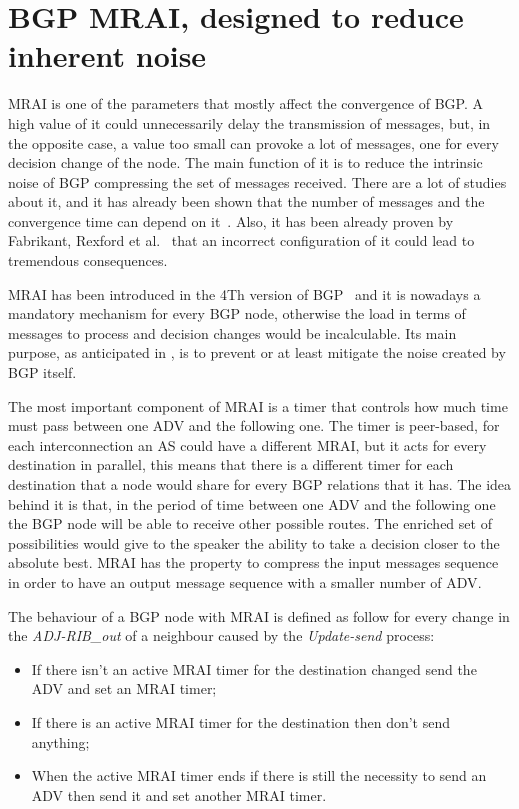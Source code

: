 
\section{BGP MRAI, designed to reduce inherent noise}
\label{sec:bgp_mrai}

\ac{MRAI} is one of the parameters that mostly affect the convergence of \ac{BGP}.
A high value of it could unnecessarily delay the transmission of messages, but,
in the opposite case, a value too small can provoke a lot of messages, one for
every decision change of the node.
The main function of it is to reduce the intrinsic noise of \ac{BGP} compressing
the set of messages received.
There are a lot of studies about it, and it has already been shown that
the number of messages and the convergence time can depend on it~\cite{griffin2001experimental}.
Also, it has been already proven by Fabrikant, Rexford et al.~\cite{fabrikant2011there}
that an incorrect configuration of it could lead to tremendous consequences.

\ac{MRAI} has been introduced in the \num{4}Th version of \ac{BGP}~\cite{rfc4271} and
it is nowadays a mandatory mechanism for every \ac{BGP} node, otherwise the load
in terms of messages to process and decision changes would be incalculable.
Its main purpose, as anticipated in , is to prevent or
at least mitigate the noise created by \ac{BGP} itself.

The most important component of \ac{MRAI} is a timer that controls how much time must pass
between one \ac{ADV} and the following one.
The timer is peer-based, for each interconnection an \ac{AS} could have a different
\ac{MRAI}, but it acts for every destination in parallel, this means that there
is a different timer for each destination that a node would share for every
\ac{BGP} relations that it has.
The idea behind it is that, in the period of time between one \ac{ADV} and the
following one the \ac{BGP} node will be able to receive other possible routes.
The enriched set of possibilities would give to the speaker the ability to take
a decision closer to the absolute best.
\ac{MRAI} has the property to compress the input messages sequence in order to have
an output message sequence with a smaller number of \ac{ADV}.

The behaviour of a \ac{BGP} node with \ac{MRAI} is defined as follow for every
change in the \textit{ADJ-RIB\_out} of a neighbour caused by the
\textit{Update-send} process:
\begin{itemize}
	\item If there isn't an active \ac{MRAI} timer for the destination changed
		send the \ac{ADV} and set an \ac{MRAI} timer;
	\item If there is an active \ac{MRAI} timer for the destination then
		don't send anything;
	\item When the active \ac{MRAI} timer ends if there is still the necessity
		to send an \ac{ADV} then send it and set another \ac{MRAI} timer.
\end{itemize}

